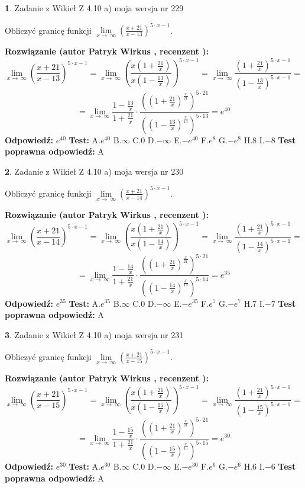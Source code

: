 \documentclass[12pt, a4paper]{article}
\theoremstyle{definition} %
\newtheorem{zad}{}
\newcommand{\zadStart}[1]{\begin{zad}#1\newline}
\newcommand{\zadStop}{\end{zad}}
\newcommand{\rozwStart}[2]{\noindent \textbf{Rozwiązanie (autor #1 , recenzent #2): }\newline}
\newcommand{\rozwStop}{\newline}
\newcommand{\odpStart}{\noindent \textbf{Odpowiedź:}\newline}
\newcommand{\odpStop}{\newline}
\newcommand{\testStart}{\noindent \textbf{Test:}\newline}
\newcommand{\testStop}{\newline}
\newcommand{\kluczStart}{\noindent \textbf{Test poprawna odpowiedź:}\newline}
\newcommand{\kluczStop}{\newline}
\begin{document}
\zadStart{Zadanie z Wikieł Z 4.10 a) moja wersja nr 229}

Obliczyć granicę funkcji  $\lim\limits_{x\to\ \infty}(\frac{x+21}{x-13})^{5\cdot x-1}$.
\zadStop
\rozwStart{Patryk Wirkus}{}
$$\lim\limits_{x\to\ \infty}(\frac{x+21}{x-13})^{5\cdot x-1} = \lim\limits_{x\to\ \infty}(\frac{x(1+\frac{21}{x})}{x(1-\frac{13}{x})})^{5\cdot x-1}=\lim\limits_{x\to\ \infty}\frac{(1+\frac{21}{x})^{5\cdot x-1}}{(1-\frac{13}{x})^{5\cdot x-1}}=$$
$$=\lim\limits_{x\to\ \infty}\frac{1-\frac{13}{x}}{1+\frac{21}{x}}\cdot\frac{((1+\frac{21}{x})^{\frac{x}{21}})^{5\cdot21}}{((1-\frac{13}{x})^{\frac{x}{13}})^{5\cdot13}}=e^{40}$$
\rozwStop
\odpStart
$e^{40}$
\odpStop
\testStart
A.$e^{40}$ B.$\infty$ C.$0$ D.$-\infty$ E.$-e^{40}$
F.$e^{8}$ G.$-e^{8}$
H.$8$
I.$-8$
\testStop
\kluczStart
A
\kluczStop



\zadStart{Zadanie z Wikieł Z 4.10 a) moja wersja nr 230}

Obliczyć granicę funkcji  $\lim\limits_{x\to\ \infty}(\frac{x+21}{x-14})^{5\cdot x-1}$.
\zadStop
\rozwStart{Patryk Wirkus}{}
$$\lim\limits_{x\to\ \infty}(\frac{x+21}{x-14})^{5\cdot x-1} = \lim\limits_{x\to\ \infty}(\frac{x(1+\frac{21}{x})}{x(1-\frac{14}{x})})^{5\cdot x-1}=\lim\limits_{x\to\ \infty}\frac{(1+\frac{21}{x})^{5\cdot x-1}}{(1-\frac{14}{x})^{5\cdot x-1}}=$$
$$=\lim\limits_{x\to\ \infty}\frac{1-\frac{14}{x}}{1+\frac{21}{x}}\cdot\frac{((1+\frac{21}{x})^{\frac{x}{21}})^{5\cdot21}}{((1-\frac{14}{x})^{\frac{x}{14}})^{5\cdot14}}=e^{35}$$
\rozwStop
\odpStart
$e^{35}$
\odpStop
\testStart
A.$e^{35}$ B.$\infty$ C.$0$ D.$-\infty$ E.$-e^{35}$
F.$e^{7}$ G.$-e^{7}$
H.$7$
I.$-7$
\testStop
\kluczStart
A
\kluczStop



\zadStart{Zadanie z Wikieł Z 4.10 a) moja wersja nr 231}

Obliczyć granicę funkcji  $\lim\limits_{x\to\ \infty}(\frac{x+21}{x-15})^{5\cdot x-1}$.
\zadStop
\rozwStart{Patryk Wirkus}{}
$$\lim\limits_{x\to\ \infty}(\frac{x+21}{x-15})^{5\cdot x-1} = \lim\limits_{x\to\ \infty}(\frac{x(1+\frac{21}{x})}{x(1-\frac{15}{x})})^{5\cdot x-1}=\lim\limits_{x\to\ \infty}\frac{(1+\frac{21}{x})^{5\cdot x-1}}{(1-\frac{15}{x})^{5\cdot x-1}}=$$
$$=\lim\limits_{x\to\ \infty}\frac{1-\frac{15}{x}}{1+\frac{21}{x}}\cdot\frac{((1+\frac{21}{x})^{\frac{x}{21}})^{5\cdot21}}{((1-\frac{15}{x})^{\frac{x}{15}})^{5\cdot15}}=e^{30}$$
\rozwStop
\odpStart
$e^{30}$
\odpStop
\testStart
A.$e^{30}$ B.$\infty$ C.$0$ D.$-\infty$ E.$-e^{30}$
F.$e^{6}$ G.$-e^{6}$
H.$6$
I.$-6$
\testStop
\kluczStart
A
\kluczStop
\end{document}
